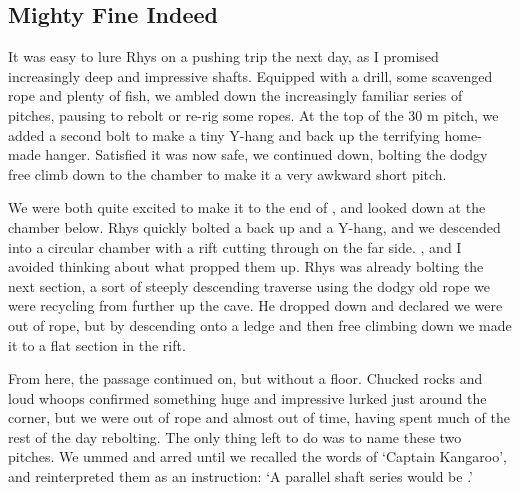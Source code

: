 \subsection{Mighty Fine Indeed}
\begin{marginfigure}
\end{marginfigure}
It was easy to lure Rhys on a pushing trip the next day, as I promised increasingly deep and impressive shafts. Equipped with a drill, some scavenged rope and plenty of fish, we ambled down the increasingly familiar series of pitches, pausing to rebolt or re-rig some ropes. At the top of the 30 m  pitch, we added a second bolt to make a tiny Y-hang and back up the terrifying home-made hanger. Satisfied it was now safe, we continued down, bolting the dodgy free climb down to the  chamber to make it a very awkward short pitch.
 
We were both quite excited to make it to the end of , and looked down at the chamber below. Rhys quickly bolted a back up and a Y-hang, and we descended into a circular chamber with a rift cutting through on the far side. , and I avoided thinking about what propped them up. Rhys was already bolting the next section, a sort of steeply descending traverse using the dodgy old rope we were recycling from further up the cave. He dropped down and declared we were out of rope, but by descending onto a ledge and then free climbing down we made it to a flat section in the rift.
 
From here, the passage continued on, but without a floor. Chucked rocks and loud whoops confirmed something huge and impressive lurked just around the corner, but we were out of rope and almost out of time, having spent much of the rest of the day rebolting. The only thing left to do was to name these two pitches. We ummed and arred until we recalled the words of `Captain Kangaroo', and reinterpreted them as an instruction: `A parallel shaft series would be .'

